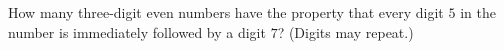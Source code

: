 How many three-digit even numbers have the property that every digit $5$ in the number is immediately followed by a digit $7$? (Digits may repeat.)

